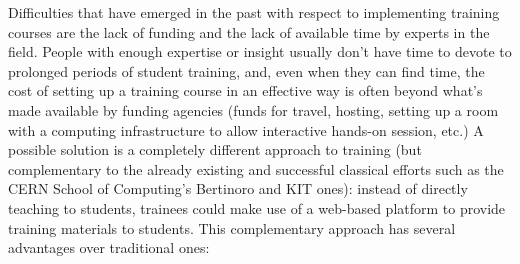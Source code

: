 \documentclass[12pt,a4paper]{article}
\begin{document}
Difficulties that have emerged in the past with respect to implementing training
courses are the lack of funding and the lack of available time by experts in the
field. People with enough expertise or insight usually don't have
time to devote to prolonged periods of student training, and, even when they can
find time, the cost of setting up a training course in an effective way is often
beyond what's made available by funding agencies (funds for travel, hosting,
setting up a room with a computing infrastructure to allow interactive hands-on
session, etc.) A possible solution is a completely different approach to
training (but complementary to the already existing and successful classical
efforts such as the CERN School of Computing's Bertinoro and KIT ones): instead
of directly teaching to students, trainees could make use of a web-based
platform to provide training materials to students. This complementary approach
has several advantages over traditional ones:
\end{document}
